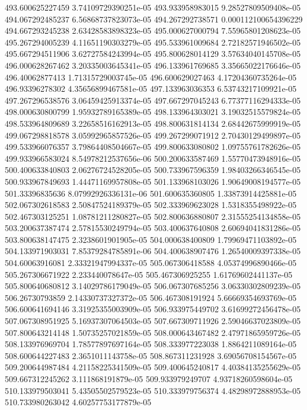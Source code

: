 {493.600625227459 3.74109729390251e-05
493.933958983015 9.28527809509408e-05
494.067292485237 6.56868737823073e-05
494.267292738571 0.000112100654396229
494.667293245238 2.63428583898323e-05
495.000627000794 7.55965801208623e-05
495.267294005239 4.11651190303279e-05
495.533961009684 2.72182571946502e-05
495.667294511906 3.62727584243994e-05
495.800628014129 3.57634040145708e-05
496.000628267462 3.20335003645341e-05
496.133961769685 3.35665022176646e-05
496.40062877413 1.71315729003745e-05
496.600629027463 4.17204360735264e-05
496.93396278302 4.35656899467581e-05
497.133963036353 6.53743217109921e-05
497.267296538576 3.06459425913374e-05
497.667297045243 6.77377116294333e-05
498.000630800799 1.95932789165389e-05
498.133964303021 3.19032515579824e-05
498.533964809689 3.22658516162913e-05
498.800631814134 2.68442675999919e-05
499.067298818578 3.05992965857526e-05
499.267299071912 2.70430129499897e-05
499.533966076357 3.79864408504667e-05
499.800633080802 1.09755761782626e-05
499.933966583024 8.54978212537656e-06
500.200633587469 1.55770473948916e-05
500.400633840803 2.06276724528205e-05
500.733967596359 1.98403266346545e-05
500.933967849693 1.44471169957808e-05
501.133968103026 1.90649008194577e-05
501.33396835636 8.07992926336131e-06
501.600635360805 1.33873914425881e-05
502.067302618583 2.50847524189379e-05
502.333969623028 1.5318355498922e-05
502.467303125251 1.08781211280827e-05
502.800636880807 2.31555254134858e-05
503.200637387474 2.57815530249794e-05
503.400637640808 2.60694041831286e-05
503.800638147475 2.3238601901905e-05
504.000638400809 1.79969471103892e-05
504.133971903031 7.85379284785891e-06
504.400638907476 1.26540009397338e-05
504.60063916081 2.33321947994337e-05
505.067306418588 4.05374996890466e-05
505.267306671922 2.233440078647e-05
505.467306925255 1.61769602441137e-05
505.800640680812 3.14029786179049e-05
506.067307685256 3.06330302809239e-05
506.26730793859 2.14330737327372e-05
506.467308191924 5.66669354693769e-05
506.600641694146 3.31925355003909e-05
506.933975449702 3.61699272456478e-05
507.067308951925 5.16937307064503e-05
507.667309711926 2.59046637023809e-05
507.800643214148 1.50735257021859e-05
508.000643467482 2.47971865959726e-05
508.133976969704 1.78577897697164e-05
508.333977223038 1.8864211089164e-05
508.600644227483 2.3651011143758e-05
508.867311231928 3.69056708154567e-05
509.200644987484 4.21158225341509e-05
509.400645240817 4.40384135255629e-05
509.667312245262 3.111868191879e-05
509.933979249707 4.93718260598604e-05
510.133979503041 5.43505502579523e-05
510.333979756374 4.48298972888953e-05
510.733980263042 4.60257753177879e-05
}
